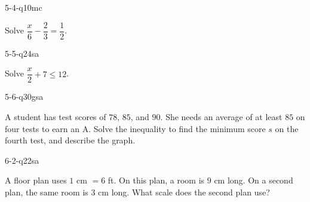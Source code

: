 \begin{practiceQuestion}{5-4-q10}{mc}
\begin{questionText}
Solve $\dfrac{x}{6} - \dfrac{2}{3} = \dfrac{1}{2}$.
\end{questionText}
\end{practiceQuestion}

\begin{practiceQuestion}{5-5-q24}{sa}
\begin{questionText}
Solve $\dfrac{x}{2} + 7 \leq 12$.
\end{questionText}
\end{practiceQuestion}

\begin{practiceQuestion}{5-6-q30}{gsa}
\begin{questionText}
A student has test scores of $78$, $85$, and $90$. She needs an average of at least $85$ on four tests to earn an A. Solve the inequality to find the minimum score $s$ on the fourth test, and describe the graph.

\begin{center}
\end{center}
\end{questionText}
\end{practiceQuestion}

\begin{practiceQuestion}{6-2-q22}{sa}
\begin{questionText}
A floor plan uses $1$ cm $= 6$ ft. On this plan, a room is $9$ cm long. On a second plan, the same room is $3$ cm long. What scale does the second plan use?
\end{questionText}
\end{practiceQuestion}

